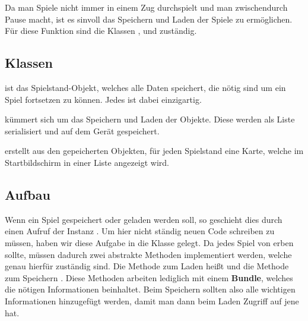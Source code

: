 Da man Spiele nicht immer in einem Zug durchspielt und man zwischendurch Pause
macht, ist es sinvoll das Speichern und Laden der Spiele zu ermöglichen. Für
diese Funktion sind die Klassen ,  und
 zuständig.

\subsection{Klassen}

 ist das Spielstand-Objekt, welches alle Daten speichert, die
nötig sind um ein Spiel fortsetzen zu können. Jedes  ist dabei
einzigartig.

 kümmert sich um das Speichern und Laden der
 Objekte. Diese werden als Liste serialisiert und auf dem Gerät
gespeichert.

 erstellt aus den gepeicherten  Objekten,
für jeden Spielstand eine Karte, welche im Startbildschirm in einer Liste
angezeigt wird.

\subsection{Aufbau}

Wenn ein Spiel gespeichert oder geladen werden soll, so geschieht dies durch
einen Aufruf der Instanz . Um hier nicht ständig neuen
Code schreiben zu müssen, haben wir diese Aufgabe in die Klasse
 gelegt. Da jedes Spiel von  erben sollte,
müssen dadurch zwei abstrakte Methoden implementiert werden, welche genau
hierfür zuständig sind.  Die Methode zum Laden heißt  und die
Methode zum Speichern . Diese Methoden arbeiten lediglich mit
einem \textbf{Bundle}, welches die nötigen Informationen beinhaltet. Beim
Speichern sollten also alle wichtigen Informationen hinzugefügt werden, damit
man dann beim Laden Zugriff auf jene hat.
